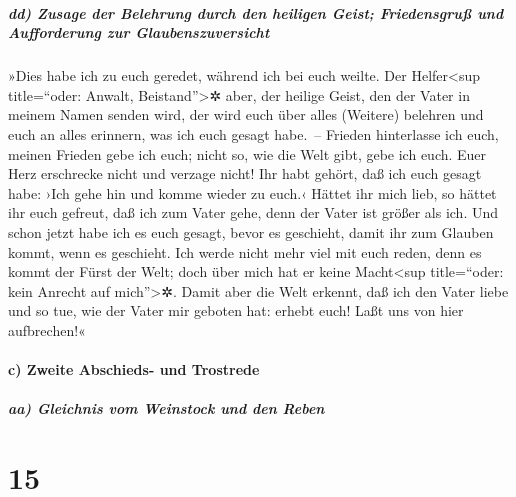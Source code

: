 \hypertarget{dd-zusage-der-belehrung-durch-den-heiligen-geist-friedensgruuxdf-und-aufforderung-zur-glaubenszuversicht}{%
\subparagraph{dd) Zusage der Belehrung durch den heiligen Geist;
Friedensgruß und Aufforderung zur
Glaubenszuversicht}\label{dd-zusage-der-belehrung-durch-den-heiligen-geist-friedensgruuxdf-und-aufforderung-zur-glaubenszuversicht}}

 »Dies habe ich zu euch geredet, während ich bei euch
weilte.  Der Helfer\textless sup title=``oder: Anwalt,
Beistand''\textgreater✲ aber, der heilige Geist, den der Vater in meinem
Namen senden wird, der wird euch über alles (Weitere) belehren und euch
an alles erinnern, was ich euch gesagt habe.~--  Frieden
hinterlasse ich euch, meinen Frieden gebe ich euch; nicht so, wie die
Welt gibt, gebe ich euch. Euer Herz erschrecke nicht und verzage nicht!
 Ihr habt gehört, daß ich euch gesagt habe: ›Ich gehe hin
und komme wieder zu euch.‹ Hättet ihr mich lieb, so hättet ihr euch
gefreut, daß ich zum Vater gehe, denn der Vater ist größer als ich.
 Und schon jetzt habe ich es euch gesagt, bevor es
geschieht, damit ihr zum Glauben kommt, wenn es geschieht.
 Ich werde nicht mehr viel mit euch reden, denn es kommt
der Fürst der Welt; doch über mich hat er keine Macht\textless sup
title=``oder: kein Anrecht auf mich''\textgreater✲. 
Damit aber die Welt erkennt, daß ich den Vater liebe und so tue, wie der
Vater mir geboten hat: erhebt euch! Laßt uns von hier aufbrechen!«

\hypertarget{c-zweite-abschieds--und-trostrede}{%
\paragraph{c) Zweite Abschieds- und
Trostrede}\label{c-zweite-abschieds--und-trostrede}}

\hypertarget{aa-gleichnis-vom-weinstock-und-den-reben}{%
\subparagraph{aa) Gleichnis vom Weinstock und den
Reben}\label{aa-gleichnis-vom-weinstock-und-den-reben}}

\hypertarget{section-14}{%
\section{15}\label{section-14}}

